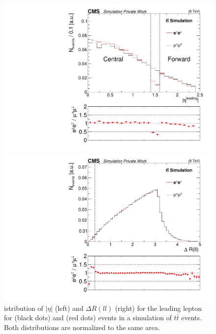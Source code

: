 \begin{figure}[htbp]
\centering
\begin{minipage}[t]{0.49\textwidth}
  \includegraphics[width=\textwidth]{plots/SELECTION/gapJustification.pdf}
\end{minipage}
\begin{minipage}[t]{0.49\textwidth}
\includegraphics[width=\textwidth]{plots/SELECTION/dRJustification_eeVSmm.pdf}
\end{minipage}
\caption{istribution of $|\eta|$ (left) and $\Delta R(ll)$ (right) for the leading lepton for \MM (black dots) and \EE (red dots) events in a simulation of $t\bar{t}$ events. Both distributions are normalized to the same area.}
\label{fig:cutJustification}
\end{figure}    

